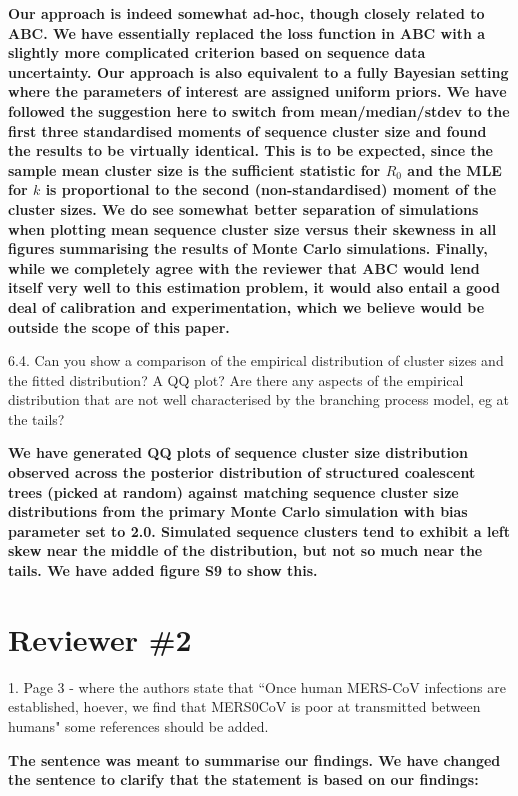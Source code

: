 \documentclass[11pt,oneside,letterpaper]{article}
\begin{document}
\textbf{Our approach is indeed somewhat ad-hoc, though closely related to ABC.
We have essentially replaced the loss function in ABC with a slightly more complicated criterion based on  sequence data uncertainty.
Our approach is also equivalent to a fully Bayesian setting where the parameters of interest are assigned uniform priors.
We have followed the suggestion here to switch from mean/median/stdev to the first three standardised moments of sequence cluster size and found the results to be virtually identical.
This is to be expected, since the sample mean cluster size is the sufficient statistic for $R_0$ and the MLE for $k$ is proportional to the second (non-standardised) moment of the cluster sizes.
We do see somewhat better separation of simulations when plotting mean sequence cluster size versus their skewness in all figures summarising the results of Monte Carlo simulations.
Finally, while we completely agree with the reviewer that ABC would lend itself  very well to this estimation problem, it would also entail a good deal of calibration and experimentation, which we believe would be outside the scope of this paper. %
}


6.4. Can you show a comparison of the empirical distribution of cluster sizes and the fitted distribution? A QQ plot? Are there any aspects of the empirical distribution that are not well characterised by the branching process model, eg at the tails?

\textbf{We have generated QQ plots of sequence cluster size distribution observed across the posterior distribution of structured coalescent trees (picked at random) against matching sequence cluster size distributions from the primary Monte Carlo simulation with bias parameter set to 2.0. Simulated sequence clusters tend to exhibit a left skew near the middle of the distribution, but not so much near the tails. We have added figure S9 to show this.}


\section*{Reviewer \#2}

1. Page 3 - where the authors state that ``Once human MERS-CoV infections are established, hoever, we find that MERS0CoV is poor at transmitted between humans" some references should be added.

\textbf{The sentence was meant to summarise our findings. We have changed the sentence to clarify that the statement is based on our findings:}
\end{document}
